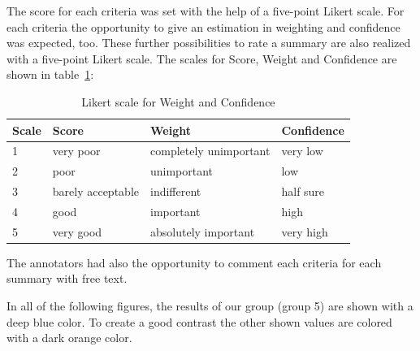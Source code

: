 The score for each criteria was set with the help of a five-point Likert scale.
For each criteria the opportunity to give an estimation in weighting and confidence was expected, too. These further possibilities to rate a summary are also realized with a five-point Likert scale.
The scales for Score, Weight and Confidence are shown in table~\ref{tab:evalikert}:

\begin{table}[H]
	\begin{tabularx}{\textwidth}{l|XXX} \toprule
		Scale & Score & Weight & Confidence \\ \midrule
		1 & very poor & completely unimportant & very low \\
		2 & poor & unimportant & low \\
		3 & barely acceptable & indifferent & half sure \\
		4 & good & important & high \\
		5 & very good & absolutely important & very high \\ \bottomrule    
	\end{tabularx}
	\caption{Likert scale for Weight and Confidence}
	\label{tab:evalikert}
\end{table}

The annotators had also the opportunity to comment each criteria for each summary with free text.

In all of the following figures, the results of our group (group 5) are shown with a deep blue color. To create a good contrast the other shown values are colored with a dark orange color.

